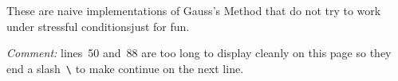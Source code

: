 These are naive implementations of Gauss's Method that do not try to 
work under stressful conditions\Dash just for fun.

\textit{Comment:} lines~50 and~88 are too long
to display cleanly on this page so they end a 
slash~\lstinline[style=inline]!\! to make \python{} continue on the
next line. 


\endinput


TODO:

